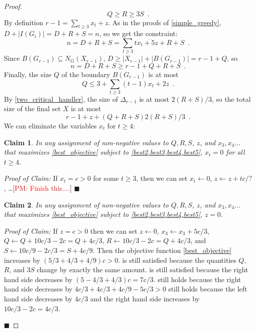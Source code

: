 \documentclass[12pt]{article}
\newtheorem{clm}{Claim}
\newenvironment{clmproof}{\noindent\emph{Proof of Claim:}}{\hfill{$\blacksquare$}\par}
\theoremstyle{definition}
\newcommand{\pat}[1]{[\textcolor{red}{PM: #1}]}
\begin{document}
\begin{proof}
  \begin{equation}
    Q \ge R \ge 3S \enspace . \label{best2}
  \end{equation}
  By definition $r-1 = \sum_{t\ge 3}x_t+z$.
  As in the proofs of \cref{simple_greedy}, $D+|I(G_i)|=D+R+S=n$, so we get the constraint:
  \begin{equation}
    n = D+R+S = \sum_{t\ge 3} tx_t + 5z + R + S \label{best3} \enspace .
  \end{equation}
  Since $B(G_{r-1})\subseteq N_G(X_{r-1})$, $D \ge |X_{r-1}|+|B(G_{r-1})|=r-1+Q$, so
  \begin{equation}
    n = D+R+S \ge r-1 + Q + R + S \enspace . \label{best4}
  \end{equation}
  Finally, the size $Q$ of the boundary $B(G_{r-1})$ is at most
  \begin{equation}
    Q \le 3 + \sum_{t\ge 3}(t-1)x_t + 2z \enspace . \label{best5}
  \end{equation}
  By \cref{two_critical_handler}, the size of $\Delta_{r-1}$ is at most $2(R+S)/3$, so the total size of the final set $X$ is at most
  \begin{equation}
    r-1 + z + (Q+R+S)2(R + S)/3 \enspace .  \label{best_objective}
  \end{equation}
  We can eliminate the variables $x_t$ for $t\ge 4$:
  \begin{clm}
    In any assignment of non-negative values to $Q, R, S$, $z$, and $x_3,x_4\ldots$ that maximizes \cref{best_objective} subject to \cref{best2,best3,best4,best5}, $x_t=0$ for all $t\ge 4$.
  \end{clm}
  \begin{clmproof}
     If $x_t = c >0$ for some $t\ge 3$, then we can set $x_t\gets 0$, $z\gets z+tc/?$, \ldots \pat{Finish this....}
  \end{clmproof}
  \begin{clm}
    In any assignment of non-negative values to $Q, R, S$, $z$, and $x_3,x_4\ldots$ that maximizes \cref{best_objective} subject to \cref{best2,best3,best4,best5}, $z=0$.
  \end{clm}
  \begin{clmproof}
    If $z = c >0$  then we can set $z\gets 0$, $x_3\gets x_3+5c/3$, $Q\gets Q+10c/3-2c=Q+4c/3$, $R\gets 10c/3-2c=Q+4c/3$, and $S\gets 10c/9-2c/3=S+4c/9$. Then the objective function \cref{best_objective} increases by $(5/3+4/3+4/9)c >0$.   is still satisfied because the quantities $Q$, $R$, and $3S$ change by exactly the same amount.   is still satisfied because the right hand side decreases by $(5-4/3+4/3)c=7c/3$.  still holds because the right hand side decreases by $4c/3 + 4c/3 +4c/9 - 5c/3>0$   still holds because the left hand side decreases by $4c/3$ and the right hand side increases by $10c/3 - 2c=4c/3$.


\end{clmproof}
\end{proof}
\end{document}
